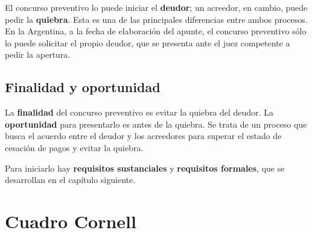 \documentclass[12pt,oneside]{book}
\begin{document}
El concurso preventivo lo puede iniciar el \textbf{deudor}; un acreedor, en cambio, puede pedir la \textbf{quiebra}. Esta es una de las principales diferencias entre ambos procesos. En la Argentina, a la fecha de elaboración del apunte, el concurso preventivo sólo lo puede solicitar el propio deudor, que se presenta ante el juez competente a pedir la apertura.

\subsection{Finalidad y oportunidad}

La \textbf{finalidad} del concurso preventivo es evitar la quiebra del deudor. La \textbf{oportunidad} para presentarlo es antes de la quiebra. Se trata de un proceso que busca el acuerdo entre el deudor y los acreedores para superar el estado de cesación de pagos y evitar la quiebra.

Para iniciarlo hay \textbf{requisitos sustanciales} y \textbf{requisitos formales}, que se desarrollan en el capítulo siguiente.

\section{Cuadro Cornell}
\end{document}
